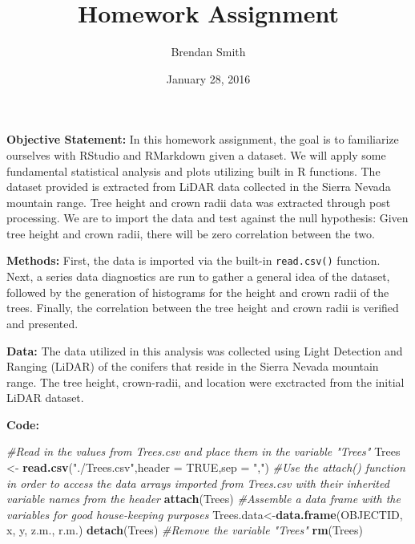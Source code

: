 \documentclass[]{article}
\title{Homework Assignment}
\author{Brendan Smith}
\date{January 28, 2016}
\newenvironment{Shaded}{\begin{snugshade}}{\end{snugshade}}
\newcommand{\KeywordTok}[1]{\textcolor[rgb]{0.13,0.29,0.53}{\textbf{{#1}}}}
\newcommand{\DataTypeTok}[1]{\textcolor[rgb]{0.13,0.29,0.53}{{#1}}}
\newcommand{\StringTok}[1]{\textcolor[rgb]{0.31,0.60,0.02}{{#1}}}
\newcommand{\CommentTok}[1]{\textcolor[rgb]{0.56,0.35,0.01}{\textit{{#1}}}}
\newcommand{\OtherTok}[1]{\textcolor[rgb]{0.56,0.35,0.01}{{#1}}}
\newcommand{\NormalTok}[1]{{#1}}
\begin{document}
\maketitle


\textbf{Objective Statement:} In this homework assignment, the goal is
to familiarize ourselves with RStudio and RMarkdown given a dataset. We
will apply some fundamental statistical analysis and plots utilizing
built in R functions. The dataset provided is extracted from LiDAR data
collected in the Sierra Nevada mountain range. Tree height and crown
radii data was extracted through post processing. We are to import the
data and test against the null hypothesis: Given tree height and crown
radii, there will be zero correlation between the two.

\textbf{Methods:} First, the data is imported via the built-in
\texttt{read.csv()} function. Next, a series data diagnostics are run to
gather a general idea of the dataset, followed by the generation of
histograms for the height and crown radii of the trees. Finally, the
correlation between the tree height and crown radii is verified and
presented.

\textbf{Data:} The data utilized in this analysis was collected using
Light Detection and Ranging (LiDAR) of the conifers that reside in the
Sierra Nevada mountain range. The tree height, crown-radii, and location
were exctracted from the initial LiDAR dataset.

\textbf{Code:}

\begin{Shaded}
\begin{Highlighting}[]
\CommentTok{#Read in the values from Trees.csv and place them in the variable "Trees"}
\NormalTok{Trees <-}\StringTok{ }\KeywordTok{read.csv}\NormalTok{(}\StringTok{"./Trees.csv"}\NormalTok{,}\DataTypeTok{header =} \OtherTok{TRUE}\NormalTok{,}\DataTypeTok{sep =} \StringTok{","}\NormalTok{)}
\CommentTok{#Use the attach() function in order to access the data arrays imported from Trees.csv with their inherited variable names from the header}
\KeywordTok{attach}\NormalTok{(Trees)}
\CommentTok{#Assemble a data frame with the variables for good house-keeping purposes}
\NormalTok{Trees.data<-}\KeywordTok{data.frame}\NormalTok{(OBJECTID, x, y, z.m., r.m.)}
\KeywordTok{detach}\NormalTok{(Trees)}
\CommentTok{#Remove the variable "Trees"}
\KeywordTok{rm}\NormalTok{(Trees)}
\end{Highlighting}
\end{Shaded}
\end{document}

